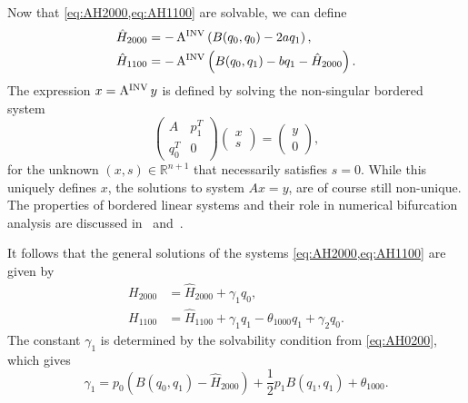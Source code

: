 Now that \cref{eq:AH2000,eq:AH1100} are solvable, we can define
\begin{align*}
\hat H_{2000} &= -\operatorname{A^{\text{INV}}} \left( B(q_0,q_0) - 2aq_1 \right), \\
\hat H_{1100} &= -\operatorname{A^{\text{INV}}} \left( B(q_0,q_1) - bq_1 - \hat H_{2000} \right).
\end{align*}
The expression $x=\operatorname{A^{\text{INV}}} y$ is defined by solving the non-singular
bordered system
\begin{equation*}
\begin{pmatrix}
A & p_1^T \\ q_0^T & 0
\end{pmatrix}
\begin{pmatrix}
x\\ s
\end{pmatrix}
=
\begin{pmatrix}
y\\ 0
\end{pmatrix},
\end{equation*}
for the unknown $(x,s) \in \mathbb R^{n+1}$ that necessarily satisfies $s = 0$.
While this uniquely defines $x$, the solutions to system $Ax=y$, are of course
still non-unique. The properties of bordered linear systems and their role in
numerical bifurcation analysis are discussed in~\cite{Keller1987Numerical}
and~\cite[Chapter 3]{govaerts2000numerical}.

It follows that the general solutions of the systems \cref{eq:AH2000,eq:AH1100}
are given by
\begin{align*}
H_{2000} &= \hat H_{2000} + \gamma_1 q_0, \\
H_{1100} &= \hat H_{1100} + \gamma_1 q_1 - \theta_{1000} q_1 + \gamma_2 q_0.
\end{align*}
The constant $\gamma_1$ is determined by the solvability condition from
\cref{eq:AH0200}, which gives
\begin{equation*}
\gamma_1 = p_0  \left( B(q_0,q_1) -\hat H_{2000} \right) 
								+ \frac12 p_1 B(q_1,q_1) + \theta_{1000}.
\end{equation*}

